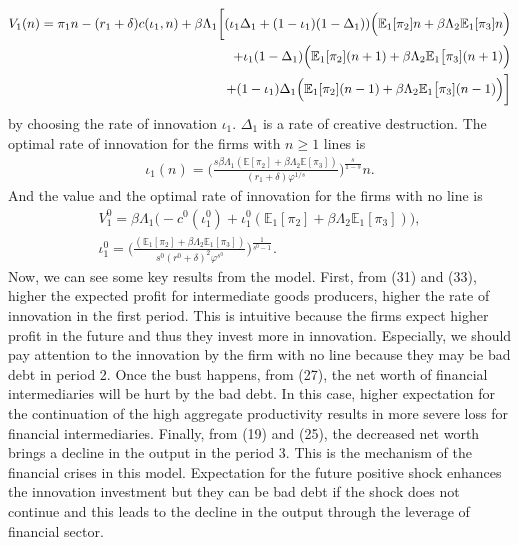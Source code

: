 \documentclass[a4paper,12pt]{article}
\begin{document}
\begin{align}
    V_1(n) = \pi_1 n - (r_1+\delta) c(\iota_1, n) + \beta\Lambda_1\bigg[ (\iota_1\Delta_1 + (1-\iota_1)(1-\Delta_1) )\Big(\mathbb{E}_1 [\pi_2]n + \beta\Lambda_2 \mathbb{E}_1[\pi_3]n \Big)\notag \\
    +\iota_1(1-\Delta_1)\Big(\mathbb{E}_1 [\pi_2] (n+1) + \beta\Lambda_2 \mathbb{E}_1\big[\pi_3] (n+1)\Big)\notag \\
    +(1-\iota_1)\Delta_1 \Big(\mathbb{E}_1 [\pi_2] (n-1) + \beta\Lambda_2 \mathbb{E}_1\big[\pi_3 ](n-1)\Big)\bigg]
\end{align}
by choosing the rate of innovation $\iota_1$. $\Delta_1$ is a rate of creative destruction. The optimal rate of innovation for the firms with $n\geq 1$ lines is
\begin{align}
    \iota_1(n) = \bigg(\frac{s\beta\Lambda_1 (\mathbb{E}[\pi_2]+ \beta \Lambda_2\mathbb{E}[\pi_3])}{(r_1 + \delta)\varphi^{1/s}} \bigg)^\frac{s}{1-s} n.
\end{align}
And the value and the optimal rate of innovation for the firms with no line is
\begin{align}
    V^0_1 = \beta \Lambda_1 \Big(-c^0(\iota^0_1) +\iota_1^0 (\mathbb{E}_1[\pi_2] + \beta\Lambda_2 \mathbb{E}_1[\pi_3] )\Big),\\
    \iota_1^0 = \bigg(\frac{(\mathbb{E}_1[\pi_2]+ \beta \Lambda_2\mathbb{E}_1[\pi_3])}{s^0(r^0 + \delta)^2 \varphi^{s^0}} \bigg)^\frac{1}{s^0-1}.
\end{align}
Now, we can see some key results from the model. First, from (31) and (33), higher the expected profit for intermediate goods producers, higher the rate of innovation in the first period. This is intuitive because the firms expect higher profit in the future and thus they invest more in innovation. Especially, we should pay attention to the innovation by the firm with no line because they may be bad debt in period 2. Once the bust happens, from (27), the net worth of financial intermediaries will be hurt by the bad debt. In this case, higher expectation for the continuation of the high aggregate productivity results in more severe loss for financial intermediaries. Finally, from (19) and (25), the decreased net worth brings a decline in the output in the period 3. This is the mechanism of the financial crises in this model. Expectation for the future positive shock enhances the innovation investment but they can be bad debt if the shock does not continue and this leads to the decline in the output through the leverage of financial sector.\par
\end{document}
